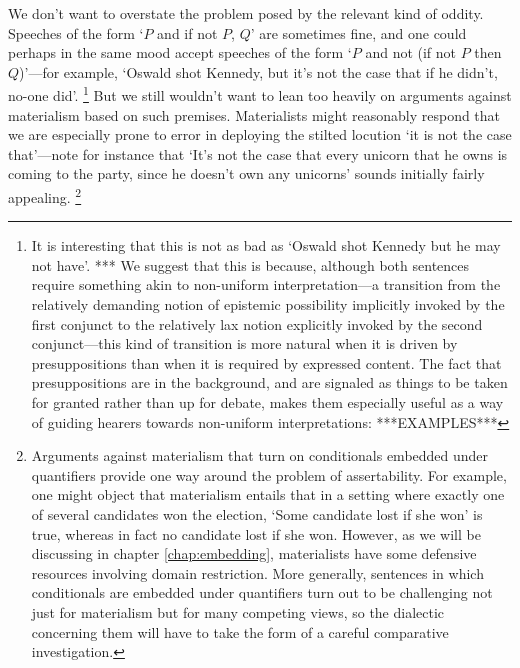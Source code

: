 \documentclass[If.tex]{subfiles}
\begin{document}
We don't want to overstate the problem posed by the relevant kind of oddity.  Speeches of the form ‘$P$ and if not $P$, $Q$’ are sometimes fine, and one could perhaps in the same mood accept speeches of the form ‘$P$ and not (if not $P$ then $Q$)’---for example, ‘Oswald shot Kennedy, but it's not the case that if he didn't, no-one did’.%
\footnote{It is interesting that this is not as bad as ‘Oswald shot Kennedy but he may not have’.  
*** We suggest that this is because, although both sentences require something akin to non-uniform interpretation---a transition from the relatively demanding notion of epistemic possibility implicitly invoked by the first conjunct to the relatively lax notion explicitly invoked by the second conjunct---this kind of transition is more natural when it is driven by presuppositions than when it is required by expressed content.  The fact that presuppositions are in the background, and are signaled as things to be taken for granted rather than up for debate, makes them especially useful as a way of guiding hearers towards non-uniform interpretations: ***EXAMPLES***}
But we still wouldn't want to lean too heavily on arguments against materialism based on such premises.  Materialists might reasonably respond that we are especially prone to error in deploying the stilted locution ‘it is not the case that’---note for instance that ‘It's not the case that every unicorn that he owns is coming to the party, since he doesn't own any unicorns’ sounds initially fairly appealing.%
\footnote{Arguments against materialism that turn on conditionals embedded under quantifiers provide one way around the problem of assertability.  For example, one might object that materialism entails that in a setting where exactly one of several candidates won the election, ‘Some candidate lost if she won’ is true, whereas in fact no candidate lost if she won.  However, as we will be discussing in chapter \autoref{chap:embedding}, materialists have some defensive resources involving domain restriction.  More generally, sentences in which conditionals are embedded under quantifiers turn out to be challenging not just for materialism but for many competing views, so the dialectic concerning them will have to take the form of a careful comparative investigation.}  
\end{document}
